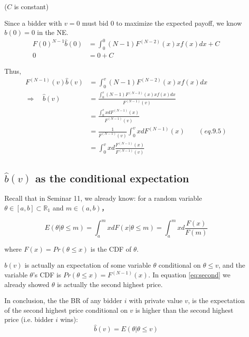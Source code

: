\documentclass{article}
\newcommand{\R}{\mathbb{R}}
\begin{document}
\begin{mdframed}[backgroundcolor=blue!20,linecolor=white]
($C$ is constant)

\medskip

Since a bidder with $v=0$ must bid $0$ to maximize the expected payoff, we know $\hat{b}(0)=0$ in the NE.
\begin{align*}
F(0)^{N-1}\hat{b}(0)&= \int_0^{0} (N-1)F^{(N-2)}(x)xf(x)dx + C \\
0&= 0+ C
\end{align*}

Thus,
\begin{align*}
F^{(N-1)}(v)\hat{b}(v)&= \int_0^{v} (N-1)F^{(N-2)}(x)xf(x)dx \\
\Rightarrow \quad \hat{b}(v)&= \frac{\int_0^{v} (N-1)F^{(N-2)}(x)xf(x)dx}{F^{(N-1)}(v)} \\
&= \frac{\int_0^{v} xdF^{(N-1)}(x)}{F^{(N-1)}(v)} \\
&= \frac{1}{F^{(N-1)}(v)} \int_0^{v}x d F^{(N-1)}(x) \quad \quad (eq.9.5)  \\
&= \int_0^{v}xd\frac{F^{(N-1)}(x)}{F^{(N-1)}(v)}
\end{align*}

\subsection*{$\hat{b}(v)$ as the conditional expectation}

Recall that in Seminar 11, we already know: for a random variable $\theta \in [a,b] \subset \R_1$ and $m \in (a,b)$，

$$E(\theta|\theta \le m) = \int^m_a x d F(x|\theta \le m)=\int^m_a x d \frac{F(x)}{F(m)}$$

where $F(x) = Pr(\theta\le x)$ is the CDF of $\theta$.

\medskip

$\hat{b}(v)$ is actually an expectation of some variable $\theta$ conditional on $\theta \le v$, and the variable $\theta$'s CDF is $Pr(\theta \le x) = F^{(N-1)}(x)$. In equation \ref{eq:second} we already showed $\theta$ is actually the second highest price.

\medskip

In conclusion, the the BR of any bidder $i$ with private value $v$, is the expectation of the second highest price conditional on $v$ is higher than the second highest price (i.e. bidder $i$ wins):
\begin{equation}
\hat{b}(v) = E(\theta|\theta \le v)
    \label{eq:b}   
\end{equation}

\end{mdframed}
\end{document}
